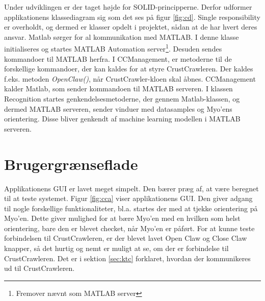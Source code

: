 
Under udviklingen er der taget højde for SOLID-principperne\citep{RefWorks:10}. Derfor udformer applikationens klassediagram sig som det ses på figur \ref{fig:cd}. Single responsibility\citep{RefWorks:9} er overholdt, og dermed er klasser opdelt i projektet, sådan at de har hvert deres ansvar. Matlab sørger for al kommunikation med MATLAB. I denne klasse initialiseres og startes MATLAB Automation server\footnote{Fremover nævnt som MATLAB server}. Desuden sendes kommandoer til MATLAB herfra. I CCManagement, er metoderne til de forskellige kommandoer, der kan kaldes for at styre CrustCrawleren. Der kaldes f.eks. metoden \textit{OpenClaw()}, når CrustCrawler-kloen skal åbnes. CCManagement kalder Matlab, som sender kommandoen til MATLAB serveren. I klassen Recognition startes genkendelsesmetoderne, der gennem Matlab-klassen, og dermed MATLAB serveren, sender vinduer med datasamples og Myo'ens orientering. Disse bliver genkendt af machine learning modellen i MATLAB serveren.



\section{Brugergrænseflade}


Applikationens GUI er lavet meget simpelt. Den bærer præg af, at være beregnet til at teste systemet. Figur \ref{fig:cca} viser applikationens GUI. Den giver adgang til nogle forskellige funktionaliteter, bl.a. startes der med at tjekke orientering på Myo'en. Dette giver mulighed for at bære Myo'en med en hvilken som helst orientering, bare den er blevet checket, når Myo'en er påført. For at kunne teste forbindelsen til CrustCrawleren, er der blevet lavet Open Claw og Close Claw knapper, så det hurtig og nemt er muligt at se, om der er forbindelse til CrustCrawleren. Det er i sektion \ref{sec:ktc} forklaret, hvordan der kommunikeres ud til CrustCrawleren.

